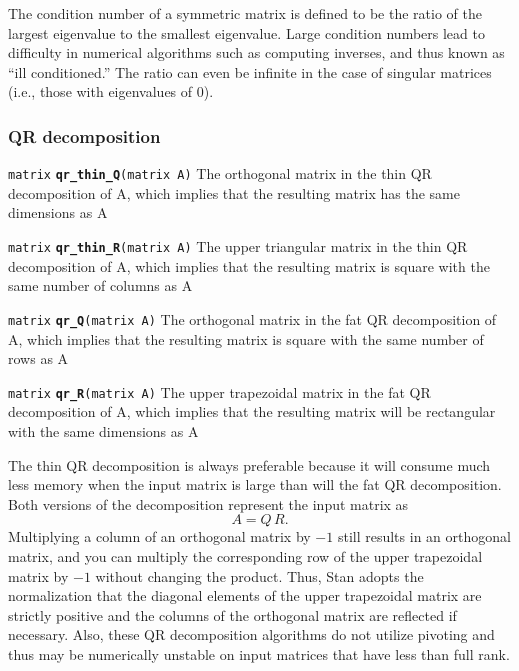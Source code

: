 \documentclass[
  10pt,
]{book}
\begin{document}
The condition number of a symmetric matrix is defined to be the ratio
of the largest eigenvalue to the smallest eigenvalue. Large condition
numbers lead to difficulty in numerical algorithms such as computing
inverses, and thus known as ``ill conditioned.'' The ratio can even be
infinite in the case of singular matrices (i.e., those with
eigenvalues of 0).

\hypertarget{QR-decomposition}{%
\subsubsection{QR decomposition}\label{QR-decomposition}}


\texttt{matrix} \textbf{\texttt{qr\_thin\_Q}}\texttt{(matrix\ A)}\newline
The orthogonal matrix in the thin QR decomposition of A, which implies
that the resulting matrix has the same dimensions as A


\texttt{matrix} \textbf{\texttt{qr\_thin\_R}}\texttt{(matrix\ A)}\newline
The upper triangular matrix in the thin QR decomposition of A, which
implies that the resulting matrix is square with the same number of
columns as A


\texttt{matrix} \textbf{\texttt{qr\_Q}}\texttt{(matrix\ A)}\newline
The orthogonal matrix in the fat QR decomposition of A, which implies
that the resulting matrix is square with the same number of rows as A


\texttt{matrix} \textbf{\texttt{qr\_R}}\texttt{(matrix\ A)}\newline
The upper trapezoidal matrix in the fat QR decomposition of A, which
implies that the resulting matrix will be rectangular with the same
dimensions as A

The thin QR decomposition is always preferable because it will consume
much less memory when the input matrix is large than will the fat QR
decomposition. Both versions of the decomposition represent the input
matrix as \[ A = Q \, R. \] Multiplying a column of an orthogonal
matrix by \(-1\) still results in an orthogonal matrix, and you can
multiply the corresponding row of the upper trapezoidal matrix by \(-1\)
without changing the product. Thus, Stan adopts the normalization that
the diagonal elements of the upper trapezoidal matrix are strictly
positive and the columns of the orthogonal matrix are reflected if
necessary. Also, these QR decomposition algorithms do not utilize
pivoting and thus may be numerically unstable on input matrices that
have less than full rank.
\end{document}
